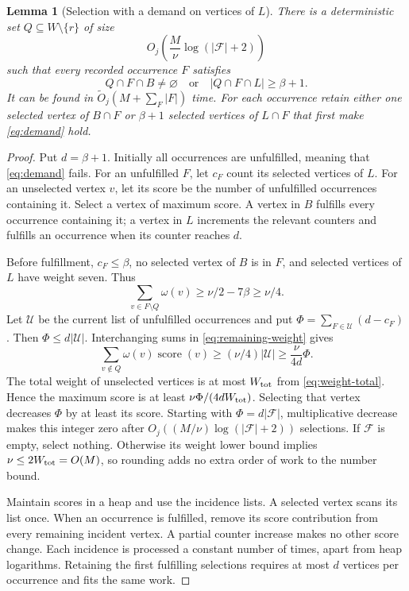 \documentclass[11pt]{article}
\newtheorem{lemma}[theorem]{Lemma}
\theoremstyle{definition}
\theoremstyle{remark}
\newcommand{\OO}{\widetilde O}
\newcommand{\wt}{\omega}
\begin{document}
\begin{lemma}[Selection with a demand on vertices of \(L\)]
\label{lem:greedy}
There is a deterministic set \(Q\subseteq W\setminus\{r\}\) of size
\[
 O_j\!\left(\frac{M}{\nu}\log(|\mathcal F|+2)\right)
\]
such that every recorded occurrence \(F\) satisfies
\begin{equation}
 Q\cap F\cap B\ne\varnothing
 \quad\text{or}\quad |Q\cap F\cap L|\ge\beta+1.
 \label{eq:demand}
\end{equation}
It can be found in \(\OO_j(M+\sum_F|F|)\) time. For each occurrence retain either one selected vertex of \(B\cap F\) or \(\beta+1\) selected vertices of \(L\cap F\) that first make \eqref{eq:demand} hold.
\end{lemma}
\begin{proof}
Put \(d=\beta+1\). Initially all occurrences are unfulfilled, meaning that \eqref{eq:demand} fails. For an unfulfilled \(F\), let \(c_F\) count its selected vertices of \(L\). For an unselected vertex \(v\), let its score be the number of unfulfilled occurrences containing it. Select a vertex of maximum score. A vertex in \(B\) fulfills every occurrence containing it; a vertex in \(L\) increments the relevant counters and fulfills an occurrence when its counter reaches \(d\).

Before fulfillment, \(c_F\le\beta\), no selected vertex of \(B\) is in \(F\), and selected vertices of \(L\) have weight seven. Thus
\begin{equation}
 \sum_{v\in F\setminus Q}\wt(v)\ge\nu/2-7\beta\ge\nu/4.
 \label{eq:remaining-weight}
\end{equation}
Let \(\mathcal U\) be the current list of unfulfilled occurrences and put
\(\Phi=\sum_{F\in\mathcal U}(d-c_F)\).
Then \(\Phi\le d|\mathcal U|\). Interchanging sums in \eqref{eq:remaining-weight} gives
\[
 \sum_{v\notin Q}\wt(v)\operatorname{score}(v)
 \ge(\nu/4)|\mathcal U|\ge\frac{\nu}{4d}\Phi.
\]
The total weight of unselected vertices is at most \(W_{\rm tot}\) from \eqref{eq:weight-total}. Hence the maximum score is at least \(\nu\Phi/(4dW_{\rm tot})\). Selecting that vertex decreases \(\Phi\) by at least its score. Starting with \(\Phi=d|\mathcal F|\), multiplicative decrease makes this integer zero after
\(O_j((M/\nu)\log(|\mathcal F|+2))\) selections. If \(\mathcal F\) is empty, select nothing. Otherwise its weight lower bound implies \(\nu\le2W_{\rm tot}=O(M)\), so rounding adds no extra order of work to the number bound.

Maintain scores in a heap and use the incidence lists. A selected vertex scans its list once. When an occurrence is fulfilled, remove its score contribution from every remaining incident vertex. A partial counter increase makes no other score change. Each incidence is processed a constant number of times, apart from heap logarithms. Retaining the first fulfilling selections requires at most \(d\) vertices per occurrence and fits the same work.
\end{proof}
\end{document}
